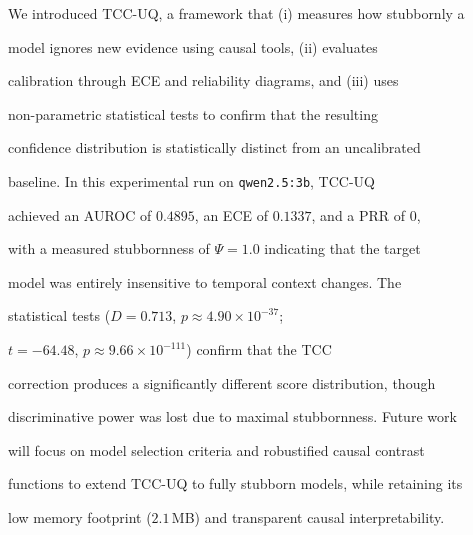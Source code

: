 \documentclass[10pt,twoside]{article}
\numberwithin{equation}{section}
\begin{document}



We introduced TCC-UQ, a framework that (i) measures how stubbornly a

model ignores new evidence using causal tools, (ii) evaluates

calibration through ECE and reliability diagrams, and (iii) uses

non-parametric statistical tests to confirm that the resulting

confidence distribution is statistically distinct from an uncalibrated

baseline. In this experimental run on \texttt{qwen2.5:3b}, TCC-UQ

achieved an AUROC of $0.4895$, an ECE of $0.1337$, and a PRR of $0$,

with a measured stubbornness of $\Psi = 1.0$ indicating that the target

model was entirely insensitive to temporal context changes. The

statistical tests ($D = 0.713$, $p \approx 4.90\times10^{-37}$;

$t = -64.48$, $p \approx 9.66\times10^{-111}$) confirm that the TCC

correction produces a significantly different score distribution, though

discriminative power was lost due to maximal stubbornness. Future work

will focus on model selection criteria and robustified causal contrast

functions to extend TCC-UQ to fully stubborn models, while retaining its

low memory footprint ($2.1$\,MB) and transparent causal interpretability.




\vspace{-10pt} 
\end{document}
